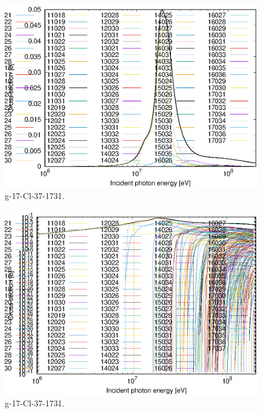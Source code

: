 \begin{figure}
 \includegraphics[width=\linewidth]{eps/g_17-Cl-37_1731.eps}
  \caption{g-17-Cl-37-1731.}
\end{figure}
\begin{figure}
 \includegraphics[width=\linewidth]{eps-log/g_17-Cl-37_1731.eps}
 \caption{g-17-Cl-37-1731.}
\end{figure}
\newpage \clearpage

